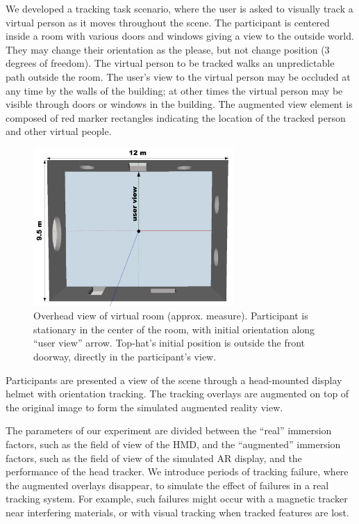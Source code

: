 \documentclass{acmsiggraph}                     %
\begin{document}
We developed a tracking task scenario, where the user is asked to visually track a virtual person as it moves throughout the scene.  The participant is centered inside a room with various doors and windows giving a view to the outside world.  They may change their orientation as the please, but not change position (3 degrees of freedom).  The virtual person to be tracked walks an unpredictable path outside the room.  The user's view to the virtual person may be occluded at any time by the walls of the building; at other times the virtual person may be visible through doors or windows in the building.  The augmented view element is composed of red marker rectangles indicating the location of the tracked person and other virtual people.

\begin{figure}[t]
	\centering
	\includegraphics[width=3in]{figures/augmentedroom.png}
	\caption{Overhead view of virtual room (approx. measure).  Participant is stationary in the center of the room, with initial orientation along ``user view'' arrow.  Top-hat's initial position is outside the front doorway, directly in the participant's view.}
\end{figure}

Participants are presented a view of the scene through a head-mounted display helmet with orientation tracking.  The tracking overlays are augmented on top of the original image to form the simulated augmented reality view.

The parameters of our experiment are divided between the ``real'' immersion factors, such as the field of view of the HMD, and the ``augmented'' immersion factors, such as the field of view of the simulated AR display, and the performance of the head tracker.  We introduce periods of tracking failure, where the augmented overlays disappear, to simulate the effect of failures in a real tracking system.  For example, such failures might occur with a magnetic tracker near interfering materials, or with visual tracking when tracked features are lost.
\end{document}
